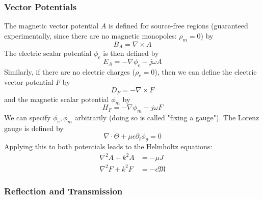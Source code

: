 \documentclass{article}
\numberwithin{equation}{section}
\begin{document}
        \subsubsection{Vector Potentials}
            The magnetic vector potential $A$ is defined for source-free regions
            (guaranteed experimentally, since there are no magnetic monopoles: $\rho_m =
            0$) by
            \begin{equation} \label{eq:magneticVectorPotential}
                B_A = \nabla \times A 
            \end{equation}
            The electric scalar potential $\phi_e$ is then defined by
            \begin{equation} \label{eq:electricScalarPotential}
                E_A = - \nabla \phi_e -j \omega A 
            \end{equation}
            Similarly, if there are no electric charges ($\rho_e = 0$), then we can
            define the electric vector potential $F$ by
            \begin{equation} \label{eq:electricVectorPotential}
                D_F = - \nabla \times F 
            \end{equation}
            and the magnetic scalar potential $\phi_m$ by
            \begin{equation} \label{eq:magneticScalarPotential}
                H_F = - \nabla \phi_m -j \omega F 
            \end{equation}
            We can specify $\phi_e, \phi_m$ arbitrarily (doing so is called "fixing a
            gauge"). The Lorenz gauge is defined by
            \begin{equation} \label{eq:LorenzGauge}
                \nabla \cdot \Theta + \mu \epsilon \partial_t \phi_{\theta} = 0 
            \end{equation}
            Applying this to both potentials leads to the Helmholtz equations:
            \begin{subequations} \label{eq:Helmholtz}
                \begin{align}
                    \nabla^2 A + k^2 A &= -\mu J \label{eq:HelmMag} \\
                    \nabla^2 F + k^2 F &= -\epsilon \mathfrak{M} \label{eq:HelmElec}
                \end{align}
            \end{subequations}
        \subsubsection{Reflection and Transmission}
\end{document}
